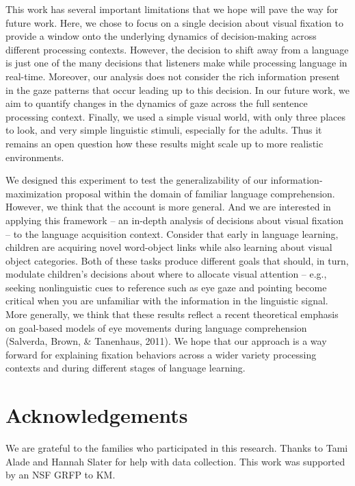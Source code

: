 \documentclass[10pt, letterpaper]{article}
\begin{document}
This work has several important limitations that we hope will pave the
way for future work. Here, we chose to focus on a single decision about
visual fixation to provide a window onto the underlying dynamics of
decision-making across different processing contexts. However, the
decision to shift away from a language is just one of the many decisions
that listeners make while processing language in real-time. Moreover,
our analysis does not consider the rich information present in the gaze
patterns that occur leading up to this decision. In our future work, we
aim to quantify changes in the dynamics of gaze across the full sentence
processing context. Finally, we used a simple visual world, with only
three places to look, and very simple linguistic stimuli, especially for
the adults. Thus it remains an open question how these results might
scale up to more realistic environments.

We designed this experiment to test the generalizability of our
information-maximization proposal within the domain of familiar language
comprehension. However, we think that the account is more general. And
we are interested in applying this framework -- an in-depth analysis of
decisions about visual fixation -- to the language acquisition context.
Consider that early in language learning, children are acquiring novel
word-object links while also learning about visual object categories.
Both of these tasks produce different goals that should, in turn,
modulate children's decisions about where to allocate visual attention
-- e.g., seeking nonlinguistic cues to reference such as eye gaze and
pointing become critical when you are unfamiliar with the information in
the linguistic signal. More generally, we think that these results
reflect a recent theoretical emphasis on goal-based models of eye
movements during language comprehension (Salverda, Brown, \& Tanenhaus,
2011). We hope that our approach is a way forward for explaining
fixation behaviors across a wider variety processing contexts and during
different stages of language learning.

\section{Acknowledgements}\label{acknowledgements}

We are grateful to the families who participated in this research.
Thanks to Tami Alade and Hannah Slater for help with data collection.
This work was supported by an NSF GRFP to KM.
\end{document}
